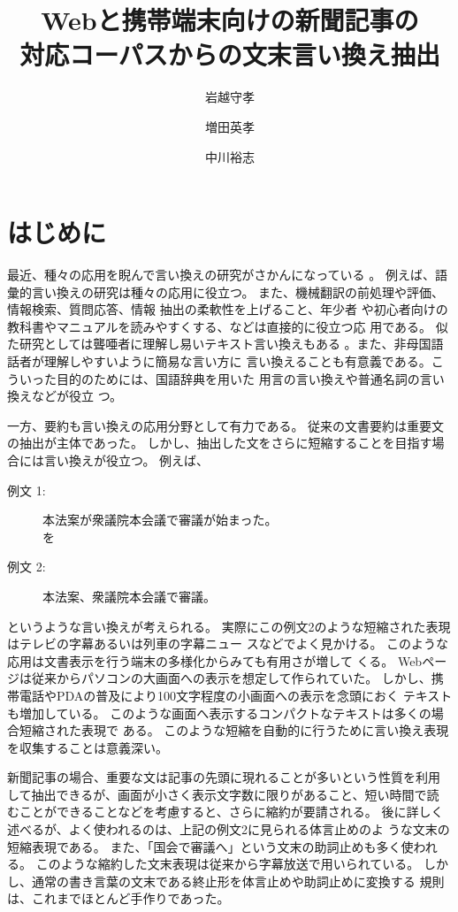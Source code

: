 \documentclass[jnlpbbl]{jnlp_j}
\title{Webと携帯端末向けの新聞記事の \\対応コーパスからの文末言い換え抽出}
\author{岩越守孝 \affiref{TDU} \and 増田英孝 \affiref{TDU} \and 中川裕志 \affiref{UT}}
\begin{document}
\maketitle

\newpage


\section{はじめに} \label{sec:hajime}

最近、種々の応用を睨んで言い換えの研究がさかんになっている
\cite{inui02,acl03}。
例えば、語彙的言い換えの研究\cite{yamamoto02}は種々の応用に役立つ。
また、機械翻訳の前処理や評価\cite{kanayama03}、情報検索、質問応答、情報
抽出の柔軟性を上げること\cite{Fabio03,Shinyama03}、年少者
や初心者向けの教科書やマニュアルを読みやすくする、などは直接的に役立つ応
用である。
似た研究としては聾唖者に理解し易いテキスト言い換えもある
\cite{inui-acl03}。また、非母国語話者が理解しやすいように簡易な言い方に
言い換えることも有意義である。こういった目的のためには、国語辞典を用いた
用言の言い換え\cite{kaji03}や普通名詞の言い換え\cite{fujita00}などが役立
つ。

一方、要約も言い換えの応用分野として有力である。
従来の文書要約は重要文の抽出が主体であった\cite{mani01}。
しかし、抽出した文をさらに短縮することを目指す場合には言い換えが役立つ。
例えば、 
\begin{description}
\item[例文 1:] \hspace{2em}本法案が衆議院本会議で審議が始まった。\\
を
\item[例文 2:] \hspace{2em}本法案、衆議院本会議で審議。
\end{description}
というような言い換えが考えられる。
実際にこの例文2のような短縮された表現はテレビの字幕あるいは列車の字幕ニュー
スなどでよく見かける。
このような応用は文書表示を行う端末の多様化からみても有用さが増して
くる。
Webページは従来からパソコンの大画面への表示を想定して作られていた。
しかし、携帯電話やPDAの普及により100文字程度の小画面への表示を念頭におく
テキストも増加している。
このような画面へ表示するコンパクトなテキストは多くの場合短縮された表現で
ある。
このような短縮を自動的に行うために言い換え表現を収集することは意義深い。

新聞記事の場合、重要な文は記事の先頭に現れることが多いという性質を利用
して抽出できるが、画面が小さく表示文字数に限りがあること、短い時間で読
むことができることなどを考慮すると、さらに縮約が要請される。
後に詳しく述べるが、よく使われるのは、上記の例文2に見られる体言止めのよ
うな文末の短縮表現である。
また、「国会で審議へ」という文末の助詞止めも多く使われる。
このような縮約した文末表現は従来から字幕放送で用いられている。
しかし、通常の書き言葉の文末である終止形を体言止めや助詞止めに変換する
規則は、これまでほとんど手作りであった\cite{ando01}。
\end{document}
